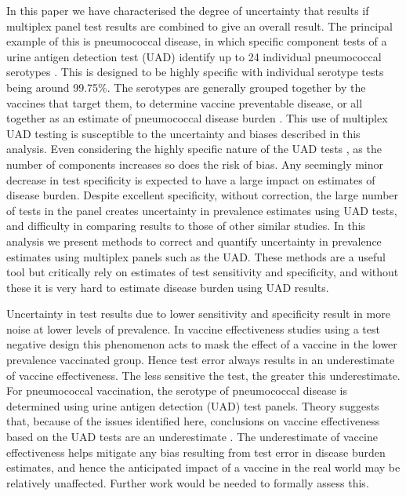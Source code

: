 \documentclass[10pt,letterpaper]{article}
\begin{document}
In this paper we have characterised the degree of uncertainty that results if multiplex panel test results are combined to give an overall result. The principal example of this is pneumococcal disease, in which specific component tests of a urine antigen detection test (UAD) identify up to 24 individual pneumococcal serotypes \cite{pride2012,bonten2015}. This is designed to be highly specific with individual serotype tests being around 99.75\%. The serotypes are generally grouped together by the vaccines that target them, to determine vaccine preventable disease, or all together as an estimate of pneumococcal disease burden \cite{hyams2023a}. This use of multiplex UAD testing is susceptible to the uncertainty and biases described in this analysis. Even considering the highly specific nature of the UAD tests \cite{pride2012}, as the number of components increases so does the risk of bias. Any seemingly minor decrease in test specificity is expected to have a large impact on estimates of disease burden. Despite excellent specificity, without correction, the large number of tests in the panel creates uncertainty in prevalence estimates using UAD tests, and difficulty in comparing results to those of other similar studies. In this analysis we present methods to correct and quantify uncertainty in prevalence estimates using multiplex panels such as the UAD. These methods are a useful tool but critically rely on estimates of test sensitivity and specificity, and without these it is very hard to estimate disease burden using UAD results.

Uncertainty in test results due to lower sensitivity and specificity result in more noise at lower levels of prevalence\cite{haile2022,endo2020}. In vaccine effectiveness studies using a test negative design this phenomenon acts to mask the effect of a vaccine in the lower prevalence vaccinated group. Hence test error always results in an underestimate of vaccine effectiveness\cite{endo2020}. The less sensitive the test, the greater this underestimate. For pneumococcal vaccination, the serotype of pneumococcal disease is determined using urine antigen detection (UAD) test panels\cite{pride2012,bonten2015}. Theory suggests that, because of the issues identified here, conclusions on vaccine effectiveness based on the UAD tests are an underestimate \cite{endo2020}. The underestimate of vaccine effectiveness helps mitigate any bias resulting from test error in disease burden estimates, and hence the anticipated impact of a vaccine in the real world may be relatively unaffected. Further work would be needed to formally assess this.
\end{document}

